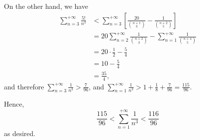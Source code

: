 \begin{enumerate}
          On the other hand, we have
          \begin{align*}
              \sum_{n = 3}^{+\infty} \frac{5!}{n^3} & < \sum_{n = 3}^{+\infty} \left[\frac{20}{\binom{n+1}{3}} - \frac{1}{\binom{n+2}{5}}\right]             \\
                                                    & = 20 \sum_{n = 2}^{+\infty} \frac{1}{\binom{n+2}{3}} - \sum_{n = 1}^{+\infty} \frac{1}{\binom{n+4}{5}} \\
                                                    & = 20 \cdot \frac{1}{2} - \frac{5}{4}                                                                   \\
                                                    & = 10 - \frac{5}{4}                                                                                     \\
                                                    & = \frac{35}{4},
          \end{align*}
          and therefore \(\sum_{n = 3}^{+\infty} \frac{1}{n^3} > \frac{7}{96}\), and \(\sum_{n = 1}^{+\infty} \frac{1}{n^3} > 1 + \frac{1}{8} + \frac{7}{96} = \frac{115}{96}\).

          Hence,
          \[
              \frac{115}{96} < \sum_{n = 1}^{+\infty} \frac{1}{n^3} < \frac{116}{96}
          \]
          as desired.
\end{enumerate}